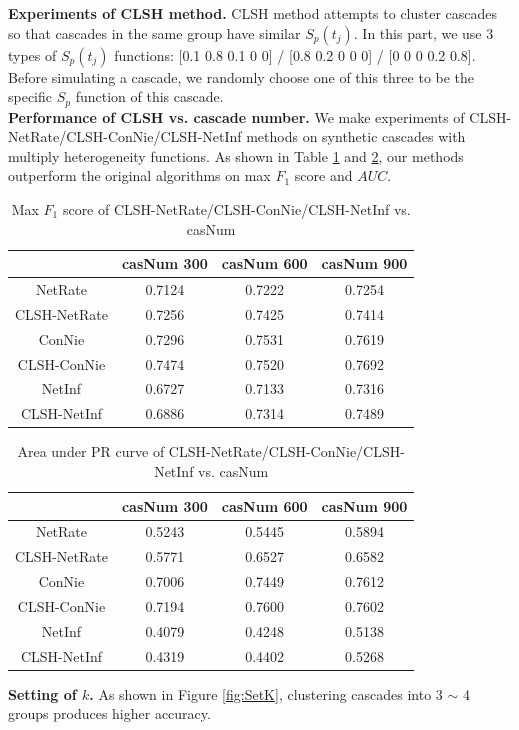\textbf{Experiments of CLSH method.}
CLSH method attempts to cluster cascades so that cascades in the same group have similar $S_p(t_j)$. In this part, we use 3 types of $S_p(t_j)$ functions: [0.1 0.8 0.1 0 0] / [0.8 0.2 0 0 0] / [0 0 0 0.2 0.8]. Before simulating a cascade, we randomly choose one of this three to be the specific $S_p$ function of this cascade.  
\\\textbf{Performance of CLSH vs. cascade number.} We make experiments of CLSH-NetRate/CLSH-ConNie/CLSH-NetInf methods on synthetic cascades with multiply heterogeneity functions. As shown in Table \ref{tab:synCLSHCASf1} and \ref{tab:synCLSHCASAUC}, our methods outperform the original algorithms on max $F_1$ score and $AUC$. 
\begin{table}[H]
\caption{Max $F_1$ score of CLSH-NetRate/CLSH-ConNie/CLSH-NetInf vs. casNum}
\begin{tabular}{c|c|c|c}
 & casNum 300 & casNum 600 & casNum 900 \\
\hline
NetRate & 0.7124 & 0.7222 & 0.7254\\
CLSH-NetRate & 0.7256 & 0.7425 & 0.7414\\
\hline
ConNie & 0.7296 & 0.7531 & 0.7619\\
CLSH-ConNie & 0.7474 & 0.7520 & 0.7692\\
\hline
NetInf & 0.6727 & 0.7133 & 0.7316\\
CLSH-NetInf & 0.6886 & 0.7314 & 0.7489
\end{tabular}\label{tab:synCLSHCASf1}
\end{table}
\begin{table}[H]
\caption{Area under PR curve of CLSH-NetRate/CLSH-ConNie/CLSH-NetInf vs. casNum}
\begin{tabular}{c|c|c|c}
 & casNum 300 & casNum 600 & casNum 900 \\
\hline
NetRate & 0.5243 & 0.5445 & 0.5894\\
CLSH-NetRate & 0.5771 & 0.6527 & 0.6582\\
\hline
ConNie & 0.7006 & 0.7449 & 0.7612\\
CLSH-ConNie & 0.7194 & 0.7600 & 0.7602\\
\hline
NetInf & 0.4079 & 0.4248 & 0.5138\\
CLSH-NetInf & 0.4319 & 0.4402 & 0.5268
\end{tabular}\label{tab:synCLSHCASAUC}
\end{table}
\textbf{Setting of $k$.} As shown in Figure \ref{fig:SetK}, clustering cascades into 3 $\sim$ 4 groups produces higher accuracy.
